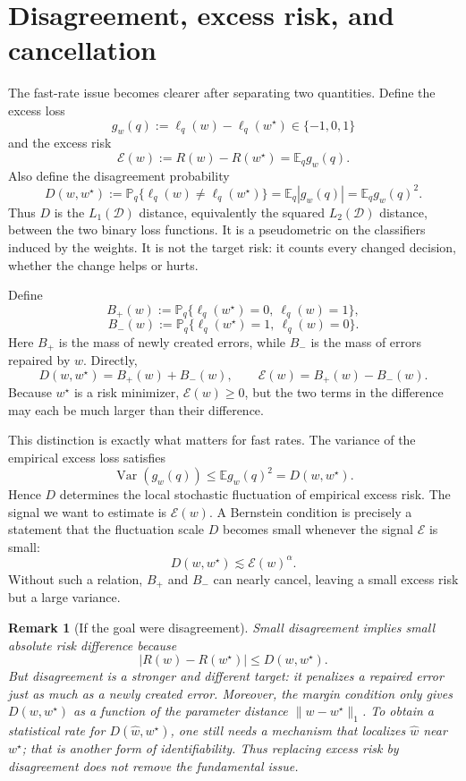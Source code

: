\documentclass[11pt]{article}
\newtheorem{remark}{Remark}
\newcommand{\D}{\mathcal D}
\newcommand{\E}{\mathbb E}
\newcommand{\Pp}{\mathbb P}
\newcommand{\wstar}{w^\star}
\begin{document}
\section{Disagreement, excess risk, and cancellation}
\label{sec:disagreement}

The fast-rate issue becomes clearer after separating two quantities.  Define the excess loss
\[
g_w(q):=\ell_q(w)-\ell_q(\wstar)\in\{-1,0,1\}
\]
and the excess risk
\[
\mathcal E(w):=R(w)-R(\wstar)=\E_q g_w(q).
\]
Also define the disagreement probability
\[
D(w,\wstar)
:=
\Pp_q\{\ell_q(w)\ne\ell_q(\wstar)\}
=
\E_q|g_w(q)|
=
\E_q g_w(q)^2.
\]
Thus $D$ is the $L_1(\D)$ distance, equivalently the squared $L_2(\D)$ distance, between the two binary loss functions.  It is a pseudometric on the classifiers induced by the weights.  It is not the target risk: it counts every changed decision, whether the change helps or hurts.

Define
\[
B_+(w)
:=
\Pp_q\{\ell_q(\wstar)=0,\ \ell_q(w)=1\},
\]
\[
B_-(w)
:=
\Pp_q\{\ell_q(\wstar)=1,\ \ell_q(w)=0\}.
\]
Here $B_+$ is the mass of newly created errors, while $B_-$ is the mass of errors repaired by $w$.  Directly,
\begin{equation}
\label{eq:sum-difference}
D(w,\wstar)=B_+(w)+B_-(w),
\qquad
\mathcal E(w)=B_+(w)-B_-(w).
\end{equation}
Because $\wstar$ is a risk minimizer, $\mathcal E(w)\ge0$, but the two terms in the difference may each be much larger than their difference.

This distinction is exactly what matters for fast rates.  The variance of the empirical excess loss satisfies
\[
\operatorname{Var}(g_w(q))
\le
\E g_w(q)^2
=
D(w,\wstar).
\]
Hence $D$ determines the local stochastic fluctuation of empirical excess risk.  The signal we want to estimate is $\mathcal E(w)$.  A Bernstein condition is precisely a statement that the fluctuation scale $D$ becomes small whenever the signal $\mathcal E$ is small:
\[
D(w,\wstar)\lesssim \mathcal E(w)^\alpha.
\]
Without such a relation, $B_+$ and $B_-$ can nearly cancel, leaving a small excess risk but a large variance.

\begin{remark}[If the goal were disagreement]
Small disagreement implies small absolute risk difference because
\[
|R(w)-R(\wstar)|\le D(w,\wstar).
\]
But disagreement is a stronger and different target: it penalizes a repaired error just as much as a newly created error.  Moreover, the margin condition only gives $D(w,\wstar)$ as a function of the parameter distance $\|w-\wstar\|_1$.  To obtain a statistical rate for $D(\widehat w,\wstar)$, one still needs a mechanism that localizes $\widehat w$ near $\wstar$; that is another form of identifiability.  Thus replacing excess risk by disagreement does not remove the fundamental issue.
\end{remark}
\end{document}
